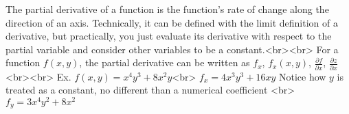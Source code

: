 The partial derivative of a function is the function's rate of change along the direction of an axis. Technically, it can be defined with the limit definition of a derivative, but practically, you just evaluate its derivative with respect to the partial variable and consider other variables to be a constant.<br><br>
For a function $f(x, y)$, the partial derivative can be written as $f_x$, $f_x(x, y)$, $\frac{\partial f}{\partial x}$, $\frac{\partial z}{\partial x}$<br><br>
Ex. $f(x, y) = x^4y^3 + 8x^2y$<br>
$f_x = 4x^3y^3 + 16xy$ Notice how $y$ is treated as a constant, no different than a numerical coefficient <br>
$f_y = 3x^4y^2 + 8x^2$
